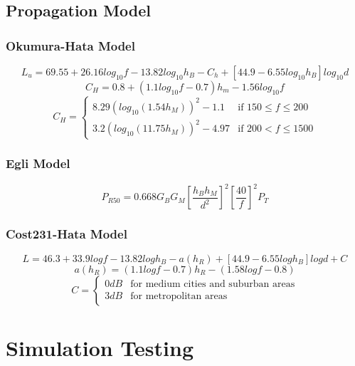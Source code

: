 \subsection{Propagation Model}\label{propagation}
\subsubsection{Okumura-Hata Model}
\begin{equation}\label{eq:okumura}
L_{u}=69.55+26.16log_{10}f-13.82log_{10}h_{B}-C_{h}+[44.9-6.55log_{10}h_{B}]log_{10}d 
\end{equation}
\begin{equation}\label{eq:oksmall}
C_{H}=0.8+(1.1log_{10}f-0.7)h_{m}-1.56log_{10}f
\end{equation}
\begin{equation}\label{eq:oklarge}
C_{H}=
	\begin{cases}
	8.29(log_{10}(1.54h_{M}))^{2}-1.1 & \mbox{if } 150 \leq f \leq 200 \\
	3.2(log_{10}(11.75h_{M}))^{2}-4.97 & \mbox{if } 200 < f \leq 1500
	\end{cases}
\end{equation}

\subsubsection{Egli Model}
\begin{equation}
P_{R50}=0.668G_{B}G_{M}[\frac{h_{B}h_{M}}{d^{2}}]^{2}[\frac{40}{f}]^{2}P_{T}
\end{equation}

\subsubsection{Cost231-Hata Model}
\begin{equation}
L=46.3+33.9logf-13.82log{h_{B}}-a(h_{R})+[44.9-6.55log{h_{B}}]log{d}+C
\end{equation}
\begin{equation}
a(h_{R})=(1.1log{f}-0.7)h_{R}-(1.58log{f}-0.8)
\end{equation}
\begin{equation}
C=
	\begin{cases}
	0 dB & \mbox{for medium cities and suburban areas} \\
	3 dB & \mbox{for metropolitan areas}
	\end{cases}
\end{equation}



\section{Simulation Testing}